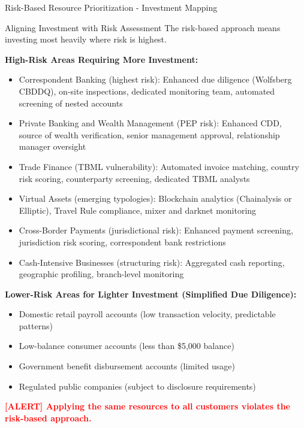 \documentclass[11pt,a4paper]{beamer}
\newcommand{\redflag}[1]{\textcolor{red}{\textbf{[ALERT] #1}}}
\begin{document}
	\begin{frame}{Risk-Based Resource Prioritization - Investment Mapping}
		\begin{block}{Aligning Investment with Risk Assessment}
			The risk-based approach means investing most heavily where risk is highest.
		\end{block}
		
		\textbf{High-Risk Areas Requiring More Investment:}
		\begin{itemize}
			\item Correspondent Banking (highest risk): Enhanced due diligence (Wolfsberg CBDDQ), on-site inspections, dedicated monitoring team, automated screening of nested accounts
			\item Private Banking and Wealth Management (PEP risk): Enhanced CDD, source of wealth verification, senior management approval, relationship manager oversight
			\item Trade Finance (TBML vulnerability): Automated invoice matching, country risk scoring, counterparty screening, dedicated TBML analysts
			\item Virtual Assets (emerging typologies): Blockchain analytics (Chainalysis or Elliptic), Travel Rule compliance, mixer and darknet monitoring
			\item Cross-Border Payments (jurisdictional risk): Enhanced payment screening, jurisdiction risk scoring, correspondent bank restrictions
			\item Cash-Intensive Businesses (structuring risk): Aggregated cash reporting, geographic profiling, branch-level monitoring
		\end{itemize}
		
		\textbf{Lower-Risk Areas for Lighter Investment (Simplified Due Diligence):}
		\begin{itemize}
			\item Domestic retail payroll accounts (low transaction velocity, predictable patterns)
			\item Low-balance consumer accounts (less than \$5,000 balance)
			\item Government benefit disbursement accounts (limited usage)
			\item Regulated public companies (subject to disclosure requirements)
		\end{itemize}
		
		\redflag{Applying the same resources to all customers violates the risk-based approach.}
	\end{frame}
	
\end{document}
